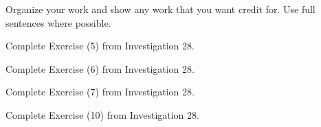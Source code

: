 \documentclass[addpoints]{exam}
\begin{document}
Organize your work and show any work that you want credit for. Use full sentences where possible.

\begin{questions}
\question 
Complete Exercise (5) from Investigation 28.

\question 
Complete Exercise (6) from Investigation 28.

\question 
Complete Exercise (7) from Investigation 28.

\question 
Complete Exercise (10) from Investigation 28.






\end{questions}
\end{document}
